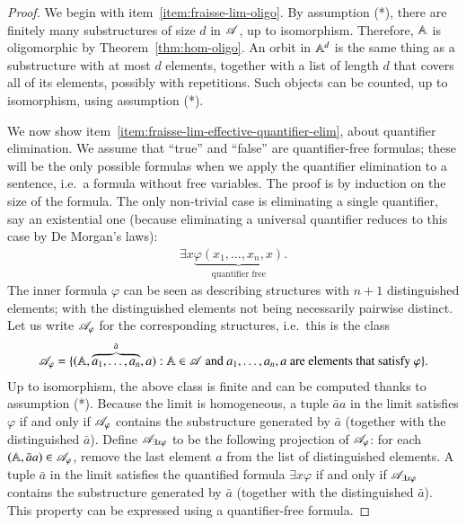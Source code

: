 \begin{proof}
	We begin with item~\ref{item:fraisse-lim-oligo}. 
	By assumption (*),  there are finitely many substructures of size $d$ in $\mathscr A$, up to isomorphism.	Therefore, $\mathbb A$ is oligomorphic by  Theorem~\ref{thm:hom-oligo}.  An orbit in $\mathbb A^d$ is the same thing as a substructure with at most $d$ elements, together with a list of length $d$ that covers all of its elements, possibly with repetitions. Such objects can be counted, up to isomorphism, using  assumption (*).

	We now show  item~\ref{item:fraisse-lim-effective-quantifier-elim}, about quantifier elimination.  
	We assume that 
	``true'' and ``false'' are quantifier-free formulas; these will be the only possible formulas when we apply the quantifier elimination to a sentence, i.e.~a formula without free variables. 
	The proof  is by induction on the size of the formula. The only non-trivial case is eliminating a single quantifier, say an existential one (because eliminating a universal quantifier reduces to this case by De Morgan's laws):
\begin{align*}
	\exists x \underbrace{\varphi(x_1,\ldots,x_n,x)}_{\text{quantifier free}}.
\end{align*}
The inner formula $\varphi$ can be seen as describing structures with $n+1$ distinguished elements; with the distinguished elements not being necessarily pairwise distinct. Let us write $\mathscr A_\varphi$ for the corresponding structures, i.e.~this is the class 
\begin{align*}
	\mathscr A_\varphi = \{(\mathbb A,\overbrace{a_1,\ldots,a_n}^{\bar a},a) : \mathbb A \in \mathscr A \text{ and $a_1,\ldots,a_n,a$ are elements that satisfy $\varphi$}\}.
\end{align*}
Up to isomorphism, the above class is finite and can be computed thanks to  assumption (*). 
Because the \fraisse limit is homogeneous, a tuple $\bar aa$ in the \fraisse limit satisfies $\varphi$ if and only if $\mathscr A_\varphi$ contains the substructure generated by $\bar a$ (together with the distinguished $\bar a$). Define 
$\mathscr A_{\exists x\varphi}$ to be the following projection of $\mathscr A_\varphi$: for each $(\mathbb A,\bar aa) \in \mathscr A_\varphi$, remove the last element $a$ from the list of distinguished elements. A tuple $\bar a$ in the \fraisse limit satisfies the quantified formula $\exists x \varphi$ if and only if $\mathscr A_{\exists x\varphi}$ contains the substructure generated by $\bar a$ (together with the distinguished $\bar a$). This property can be expressed using a quantifier-free formula.


\end{proof}
